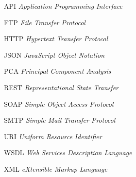 \begin{siglas}
  \item[API] \textit{Application Programming Interface}
  \item[FTP] \textit{File Transfer Protocol}
  \item[HTTP] \textit{Hypertext Transfer Protocol}
  \item[JSON] \textit{JavaScript Object Notation}
  \item[PCA] \textit{Principal Component Analysis}
  \item[REST] \textit{Representational State Transfer}
  \item[SOAP] \textit{Simple Object Access Protocol}
  \item[SMTP] \textit{Simple Mail Transfer Protocol}
  \item[URI] \textit{Uniform Resource Identifier}
  \item[WSDL] \textit{Web Services Description Language}
  \item[XML] \textit{eXtensible Markup Language}
\end{siglas}
